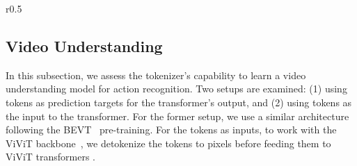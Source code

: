 \setlength\intextsep{20pt}
\begin{wraptable}{r}{0.5\textwidth}
\centering
\caption{\textbf{Video action recognition performance}\\(classification accuracy$\uparrow$ $\times$100).}
\label{tab:understanding}
\vspace{-2mm}
\vspace{-14mm}
\end{wraptable}
\vspace{-8mm}
\leavevmode\subsection{Video Understanding}
\vspace{-2mm}
In this subsection, we assess the tokenizer's capability to learn a video understanding model for action recognition. Two setups are examined: (1) using tokens as prediction targets for the transformer's output, and (2) using tokens as the input to the transformer. For the former setup, we use a similar architecture following the BEVT~\citep{wang2022bevt} pre-training. For the tokens as inputs, to work with the ViViT backbone~\citep{arnab2021vivit}, we detokenize the tokens to pixels before feeding them to  ViViT transformers .

